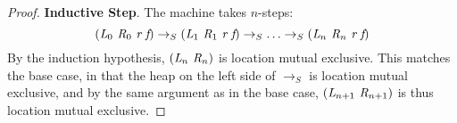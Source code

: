 \begin{proof}
\noindent\textbf{Inductive Step}. The machine takes $n$-steps:
\[
(\cfgnt{L}_0\ \cfgnt{R}_0\ \cfgnt{r}\ \cfgnt{f}) \rightarrow_S (\cfgnt{L}_1\ \cfgnt{R}_1\ \cfgnt{r}\ \cfgnt{f}) \rightarrow_S \ldots \rightarrow_S
(\cfgnt{L}_n\ \cfgnt{R}_n\ \cfgnt{r}\ \cfgnt{f})
\]
By the induction hypothesis, $(\cfgnt{L}_n\ \cfgnt{R}_n)$ is location
mutual exclusive. This matches the base case, in that the heap on the
left side of $\rightarrow_S$ is location mutual exclusive, and by the
same argument as in the base case,
$(\cfgnt{L}_{n+1}\ \cfgnt{R}_{n+1})$ is thus location mutual exclusive.

\begin{comment}
The Field Access rule uses the Summarize rule to describe the relation between $\cfgnt{L}_{s}$ and $\cfgnt{L}_{s^\prime}$. Because the summarize rule is essentially a fixed-point computation, we can reason about it as a machine that produces a sequence of intermediate states $s_1, s_2, ... , s_n$. We will use an inductive argument to show that the mutual exclusion property holds for any of those intermediate states. First, let state $s_\alpha$ be any state for which the property in Theorem~\ref{thm:mutex} holds, and let $s_\beta$ be the intermediate state where $s_\alpha \rightarrow_S s_\beta$. If all fields are initialized, then $s_\alpha$ and $s_\beta$ are identical, so the mutually exclusive property holds for $s_\beta$. 

\end{comment}
\end{proof}

